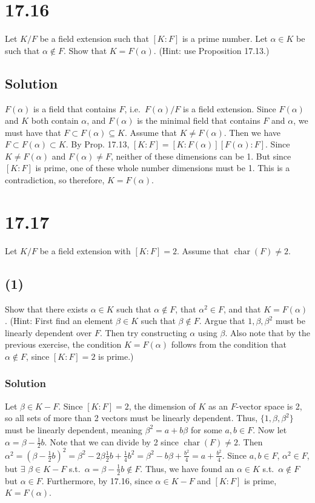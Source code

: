 \documentclass[fleqn]{article}
\DeclareMathOperator{\Char}{char}
\begin{document}
    \section{17.16}
    Let $K/F$ be a field extension such that $[K : F]$ is a prime number.  Let $\alpha \in K$ be such that $\alpha \notin F$.  Show that $K = F(\alpha)$.  (Hint: use Proposition 17.13.)
        
        \subsection{Solution}
        $F(\alpha)$ is a field that contains $F$, i.e.\ $F(\alpha)/F$ is a field extension.  Since $F(\alpha)$ and $K$ both contain $\alpha$, and $F(\alpha)$ is the minimal field that contains $F$ and $\alpha$, we must have that $F \subset F(\alpha) \subseteq K$.  Assume that $K \neq F(\alpha)$.  Then we have $F \subset F(\alpha) \subset K$.  By Prop. 17.13, $[K : F] = [K : F(\alpha)] [F(\alpha) : F]$.  Since $K \neq F(\alpha)$ and $F(\alpha) \neq F$, neither of these dimensions can be 1.  But since $[K : F]$ is prime, one of these whole number dimensions must be 1.  This is a contradiction, so therefore, $K = F(\alpha)$.
    
    \section{17.17}
    Let $K/F$ be a field extension with $[K : F] = 2$.  Assume that $\Char(F) \neq 2$.
        
        \subsection{(1)}
        Show that there exists $\alpha \in K$ such that $\alpha \notin F$, that $\alpha^2 \in F$, and that $K = F(\alpha)$.  (Hint: First find an element $\beta \in K$ such that $\beta \notin F$.  Argue that $1, \beta, \beta^2$ must be linearly dependent over $F$.  Then try constructing $\alpha$ using $\beta$.  Also note that by the previous exercise, the condition $K = F(\alpha)$ follows from the condition that $\alpha \notin F$, since $[K : F] = 2$ is prime.)
            
            \subsubsection{Solution}
            Let $\beta \in K - F$.  Since $[K : F] = 2$, the dimension of $K$ as an $F$-vector space is 2, so all sets of more than 2 vectors must be linearly dependent.  Thus, $\{1, \beta, \beta^2\}$ must be linearly dependent, meaning $\beta^2 = a + b \beta$ for some $a, b \in F$.  Now let $\alpha = \beta - \frac{1}{2}b$.  Note that we can divide by 2 since $\Char(F) \neq 2$.  Then $\alpha^2 = \left(\beta - \frac{1}{2}b\right)^2 = \beta^2 - 2 \beta \frac{1}{2} b + \frac{1}{4} b^2 = \beta^2 - b \beta + \frac{b^2}{4} = a + \frac{b^2}{4}$.  Since $a, b \in F$, $\alpha^2 \in F$, but $\exists$ $\beta \in K - F$ s.t.\ $\alpha = \beta - \frac{1}{2}b \notin F$.  Thus, we have found an $\alpha \in K$ s.t.\ $\alpha \notin F$ but $\alpha \in F$.  Furthermore, by 17.16, since $\alpha \in K - F$ and $[K : F]$ is prime, $K = F(\alpha)$.
        
\end{document}
